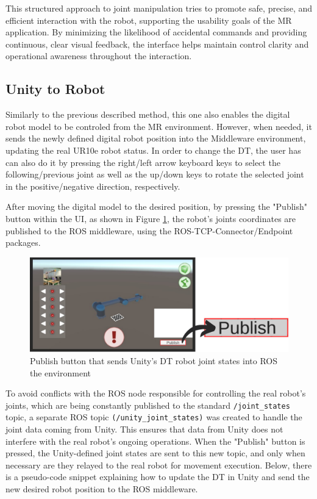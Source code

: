This structured approach to joint manipulation tries to promote safe, precise, and efficient interaction with the robot, supporting the usability goals of the \ac{MR} application. By minimizing the likelihood of accidental commands and providing continuous, clear visual feedback, the interface helps maintain control clarity and operational awareness throughout the interaction.


\subsection{Unity to Robot}
Similarly to the previous described method, this one also enables the digital robot model to be controled from the \ac{MR} environment. However, when needed, it sends the newly defined digital robot position into the Middleware environment, updating the real UR10e robot status. In order to change the \ac{DT}, the user has can also do it by pressing the right/left arrow keyboard keys to select the following/previous joint as well as the up/down keys to rotate the selected joint in the positive/negative direction, respectively.
        
After moving the digital model to the desired position, by pressing the "Publish" button within the \ac{UI}, as shown in Figure \ref{fig:publish_UI_button}, the robot's joints coordinates are published to the \ac{ROS} middleware, using the \ac{ROS}-\ac{TCP}-Connector/Endpoint packages.


\begin{figure}[htpb]
    \centering
    \includegraphics[width=0.8\linewidth]{figs/publish-button.png}
    \caption{Publish button that sends Unity's \ac{DT} robot joint states into ROS the environment}
    \label{fig:publish_UI_button}
\end{figure}

To avoid conflicts with the \ac{ROS} node responsible for controlling the real robot's joints, which are being constantly published to the standard \texttt{/joint\_states} topic, a separate \ac{ROS} topic \texttt{(/unity\_joint\_states)} was created to handle the joint data coming from Unity. This ensures that data from Unity does not interfere with the real robot’s ongoing operations. When the "Publish" button is pressed, the Unity-defined joint states are sent to this new topic, and only when necessary are they relayed to the real robot for movement execution. Below, there is a pseudo-code snippet explaining how to update the \ac{DT} in Unity and send the new desired robot position to the \ac{ROS} middleware.

